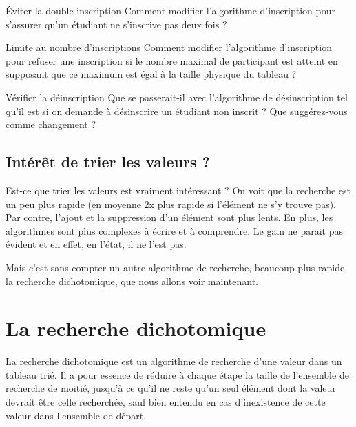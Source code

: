 			\begin{Exercice}{Éviter la double inscription}
				Comment modifier l'algorithme d'inscription
				pour s'assurer qu'un étudiant ne s'inscrive pas deux fois ?
			\end{Exercice}

			\begin{Exercice}{Limite au nombre d'inscriptions}
				Comment modifier l'algorithme d'inscription
				pour refuser une inscription si le nombre maximal
				de participant est atteint
				en supposant que ce maximum est égal à la taille physique du tableau ?
			\end{Exercice}

			\begin{Exercice}{Vérifier la déinscription}
				Que se passerait-il avec l'algorithme
				de désinscription tel qu'il est
				si on demande à désinscrire un étudiant non inscrit ?
				Que suggérez-vous comme changement ?
			\end{Exercice}

		\subsection{Intérêt de trier les valeurs ?}

			Est-ce que trier les valeurs est vraiment intéressant ?
			On voit que la recherche est un peu plus rapide
			(en moyenne 2x plus rapide si l'élément ne s'y trouve pas).
			Par contre, l'ajout et la suppression d'un élément
			sont plus lents.
			En plus, les algorithmes sont plus complexes à écrire
			et à comprendre.
			Le gain ne parait pas évident
			et en effet, en l'état, il ne l'est pas.
			
			Mais c'est sans compter 
			un autre algorithme de recherche, beaucoup plus rapide,
			la recherche dichotomique, que nous allons voir maintenant.
			
	\section{La recherche dichotomique} 

		La recherche dichotomique 
		est un algorithme de recherche d'une valeur dans un tableau trié.
		Il a pour essence de réduire à chaque étape 
		la taille de l’ensemble de recherche de moitié, 
		jusqu’à ce qu’il ne reste qu’un seul élément 
		dont la valeur devrait être celle recherchée, 
		sauf bien entendu en cas d’inexistence de cette valeur 
		dans l’ensemble de départ. 
	

